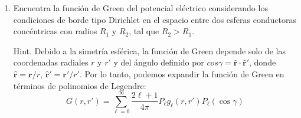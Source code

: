 \documentclass[]{article}
\numberwithin{equation}{section}
\newcommand{\0}{\textcolor{gray}{0}}
\newcommand{\rv}{\mathbf{r}}
\newcommand{\rhat}{\hat{\rv}}
\begin{document}
\begin{enumerate}
\begin{enumerate}
\begin{equation*}
		\end{equation*}
		Reemplazando de vuelta\(A^2 = (x - x')^2 + (y - y')^2 = \rho^2 + \rho'^2 - 2\rho\rho' \cos\left(\theta - \theta'\right)\):
		\begin{equation*}
			\Phi(\rv) = \frac{z V}{2\pi}\int_{0}^{a}\int_{0}^{2\pi} \frac{1}{(\rho^2 + \rho'^2 - 2\rho\rho' \cos\left(\theta - \theta'\right) + z^2)^{3/2}}\rho'\, d\theta' d\rho'
		\end{equation*}
		Redefiniendo el origen de la coordenada \(\theta\) convenientemente:
		\begin{equation*}
			\Phi(\rv) = \frac{z V}{2\pi}\int_{0}^{a}\int_{0}^{2\pi} \frac{1}{(\rho^2 + \rho'^2 - 2\rho\rho' \cos\left(\theta'\right) + z^2)^{3/2}}\rho'\, d\theta' d\rho'
		\end{equation*}
		
		\item Demuestre que, a lo largo del eje del círculo (\(\rho = 0\)), el potencial está dado por
		\begin{equation*}
			\Phi = V \left(1 - \frac{z}{\sqrt{a^2 + z^2}}\right)
		\end{equation*}
		
		\textbf{R:} Reemplazando \(\rho = 0\) tenemos que
		\begin{align*}
			\Phi(\rv) &= \frac{z V}{2\pi}\int_{0}^{a}\int_{0}^{2\pi} \frac{1}{(\rho'^2 + z^2)^{3/2}}\rho'\, d\theta' d\rho'\\
			&= z V \int_{0}^{a} \frac{\rho'}{(\rho'^2 + z^2)^{3/2}}\, d\rho'\\
			&= V \left(1 - \frac{z}{\sqrt{a^2 + z^2}}\right)
		\end{align*}
	\end{enumerate}
	
	\item Encuentra la función de Green del potencial eléctrico considerando los condiciones de borde tipo Dirichlet en el espacio entre dos esferas conductoras concéntricas con radios \(R_1\) y \(R_2\), tal que \(R_2 > R_1\).
	
	Hint. Debido a la simetría esférica, la función de Green depende solo de las coordenadas radiales \(r\) y \(r'\) y del ángulo definido por \(cos \gamma = \rhat\cdot\rhat'\), donde \(\rhat = \rv/r\), \(\rhat' = \rv'/r'\). Por lo tanto, podemos expandir la función de Green en términos de polinomios de Legendre:
	\begin{equation*}
		G(r,r') = \sum_{\ell=0}^{\infty} \frac{2\ell + 1}{4\pi}P_{\ell} g_\ell(r,r') P_{\ell}(\cos\gamma)
	\end{equation*}
	

\end{enumerate}
\end{document}
